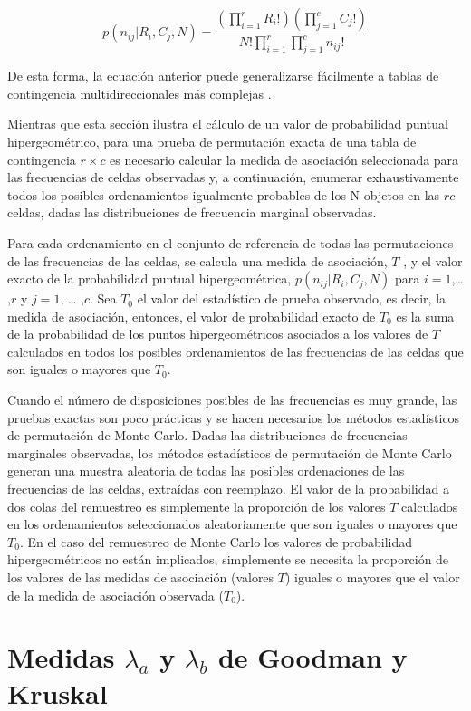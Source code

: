 \documentclass[12pt,a4paper,]{book}
\numberwithin{dummy}{section}
\theoremstyle{ocrenumbox}
\theoremstyle{blacknumex}
\theoremstyle{blacknumbox}
\theoremstyle{ocrenum}
\theoremstyle{ocrenum}
\begin{document}
\[
p(n_{ij}|R_i,C_j,N)=\frac{(\displaystyle\prod_{i=1}^rR_i!)(\prod_{j=1}^cC_j!)}{N!\displaystyle\prod_{i=1}^r\prod_{j=1}^cn_{ij}!}
\]

De esta forma, la ecuación anterior puede generalizarse fácilmente a
tablas de contingencia multidireccionales más complejas
\citep{Mielke1988}.

Mientras que esta sección ilustra el cálculo de un valor de probabilidad
puntual hipergeométrico, para una prueba de permutación exacta de una
tabla de contingencia \(r\times c\) es necesario calcular la medida de
asociación seleccionada para las frecuencias de celdas observadas y, a
continuación, enumerar exhaustivamente todos los posibles ordenamientos
igualmente probables de los N objetos en las \(rc\)celdas, dadas las
distribuciones de frecuencia marginal observadas.

Para cada ordenamiento en el conjunto de referencia de todas las
permutaciones de las frecuencias de las celdas, se calcula una medida de
asociación, \(T\) , y el valor exacto de la probabilidad puntual
hipergeométrica, \(p(n_{ij} |R_i,C_j,N)\) para \(i = 1\),\ldots{} ,\(r\)
y \(j = 1\), \ldots{} ,\(c\). Sea \(T_0\) el valor del estadístico de
prueba observado, es decir, la medida de asociación, entonces, el valor
de probabilidad exacto de \(T_0\) es la suma de la probabilidad de los
puntos hipergeométricos asociados a los valores de \(T\) calculados en
todos los posibles ordenamientos de las frecuencias de las celdas que
son iguales o mayores que \(T_0\).

Cuando el número de disposiciones posibles de las frecuencias es muy
grande, las pruebas exactas son poco prácticas y se hacen necesarios los
métodos estadísticos de permutación de Monte Carlo. Dadas las
distribuciones de frecuencias marginales observadas, los métodos
estadísticos de permutación de Monte Carlo generan una muestra aleatoria
de todas las posibles ordenaciones de las frecuencias de las celdas,
extraídas con reemplazo. El valor de la probabilidad a dos colas del
remuestreo es simplemente la proporción de los valores \(T\) calculados
en los ordenamientos seleccionados aleatoriamente que son iguales o
mayores que \(T_0\). En el caso del remuestreo de Monte Carlo los
valores de probabilidad hipergeométricos no están implicados,
simplemente se necesita la proporción de los valores de las medidas de
asociación (valores \(T\)) iguales o mayores que el valor de la medida
de asociación observada (\(T_0\)).

\hypertarget{medidas-lambda_a-y-lambda_b-de-goodman-y-kruskal}{%
\section{\texorpdfstring{Medidas \(\lambda_a\) y \(\lambda_b\) de
Goodman y
Kruskal}{Medidas \textbackslash lambda\_a y \textbackslash lambda\_b de Goodman y Kruskal}}\label{medidas-lambda_a-y-lambda_b-de-goodman-y-kruskal}}
\end{document}
